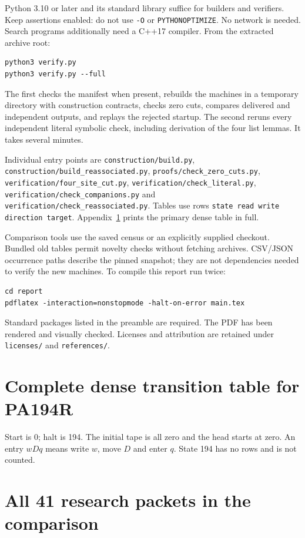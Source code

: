 \documentclass[11pt,letterpaper]{article}
\newcommand{\file}[1]{{\small\nolinkurl{#1}}}
\begin{document}
Python 3.10 or later and its standard library suffice for builders and
verifiers. Keep assertions enabled: do not use \file{-O} or
\file{PYTHONOPTIMIZE}. No network is needed. Search programs additionally
need a C++17 compiler. From the extracted archive root:
\begin{lstlisting}
python3 verify.py
python3 verify.py --full
\end{lstlisting}
The first checks the manifest when present, rebuilds the machines in
a temporary directory with construction contracts, checks zero cuts,
compares delivered and independent outputs, and replays the rejected
startup. The second reruns every independent literal symbolic check,
including derivation of the four list lemmas. It takes several minutes.

Individual entry points are \file{construction/build.py},
\file{construction/build_reassociated.py},
\file{proofs/check_zero_cuts.py},
\file{verification/four_site_cut.py},
\file{verification/check_literal.py},
\file{verification/check_companions.py} and
\file{verification/check_reassociated.py}.
Tables use rows \file{state read write direction target}.
Appendix~\ref{app:table} prints the primary dense table in full.

Comparison tools use the saved census or an explicitly supplied
checkout. Bundled old tables permit novelty checks without fetching
archives. CSV/JSON occurrence paths describe the pinned snapshot;
they are not dependencies needed to verify the new machines.
To compile this report run twice:
\begin{lstlisting}
cd report
pdflatex -interaction=nonstopmode -halt-on-error main.tex
\end{lstlisting}
Standard packages listed in the preamble are required. The PDF has
been rendered and visually checked. Licenses and attribution are
retained under \file{licenses/} and \file{references/}.

\appendix
\clearpage
\section{Complete dense transition table for PA194R}
\label{app:table}

Start is 0; halt is 194. The initial tape is all zero and the head starts
at zero. An entry $wDq$ means write $w$, move $D$ and enter $q$.
State 194 has no rows and is not counted.



\clearpage
\section{All 41 research packets in the comparison}
\label{app:ledger}
\end{document}
